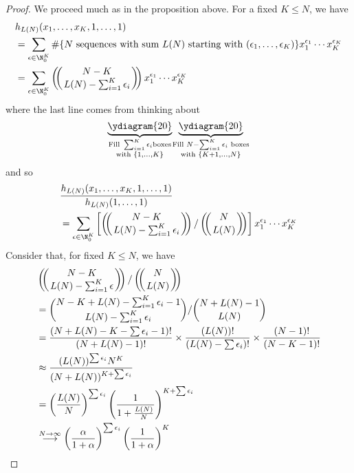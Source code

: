 \documentclass[11pt,leqno,oneside]{amsart}
\numberwithin{thm}{section}
\def\multiset#1#2{\ensuremath{\left(\kern-.3em\left(\genfrac{}{}{0pt}{}{#1}{#2}\right)\kern-.3em\right)}}
\begin{document}
\begin{proof}
  We proceed much as in the proposition above.
  For a fixed \(K \leq N\), we have
  \begin{align*}
    & h_{L(N)}(x_1, \ldots, x_K, 1, \ldots, 1) \\
    & = \sum_{\epsilon \in
      \N_0^K} \#\{N\text{ sequences with sum }L(N)\text{ starting with
      }(\epsilon_1, \ldots, \epsilon_K)\} x_1^{\epsilon_1}
      \cdots x_K^{\epsilon_K} \\
    & = \sum_{\epsilon \in \N_0^K}
      \multiset{N-K}{L(N)-\sum_{i=1}^K \epsilon_i}
      x_1^{\epsilon_1} \cdots x_K^{\epsilon_K}
  \end{align*}
  where the last line comes from thinking about \[
    \underbrace{\ydiagram{20}}_{\substack{\text{Fill }\sum_{i=1}^K \epsilon_i
      \text{boxes}\\ \text{with }\{1,\ldots,K\}}} \hspace{-0.05cm}
  \underbrace{\ydiagram{20}}_{\substack{\text{Fill }N-\sum_{i=1}^K
      \epsilon_i \text{ boxes}\\ \text{with }\{K+1, \ldots, N\}}}
  \]
  and so
  \begin{align*}
    & \frac{h_{L(N)}(x_1, \ldots, x_K, 1, \ldots,
    1)}{h_{L(N)}(1,\ldots,1)} \\
    & = \sum_{\epsilon \in
      \N_0^K} \left[\multiset{N-K}{L(N)-\sum_{i=1}^K \epsilon_i}/\multiset{N}{L(N)}\right] x_1^{\epsilon_1} \cdots x_K^{\epsilon_K}
  \end{align*}
  Consider that, for fixed \(K \leq N\), we have
  \begin{align*}
    & \multiset{N-K}{L(N)-\sum_{i=1}^K \epsilon} / 
    \multiset{N}{L(N)} \\
    & = \binom{N-K+L(N)-\sum_{i=1}^K \epsilon_i-1}{L(N)-\sum_{i=1}^K
    \epsilon_i} / \binom{N+L(N)-1}{L(N)}\\
    & = \frac{(N+L(N)-K-\sum \epsilon_i -1)!}{(N+L(N)-1)!} \times
    \frac{(L(N))!}{(L(N)-\sum \epsilon_i)!} \times
    \frac{(N-1)!}{(N-K-1)!} \\
    & \approx \frac{(L(N))^{\sum \epsilon_i} N^K}{(N+L(N))^{K+\sum
    \epsilon_i}} \\
    & = \left(\frac{L(N)}{N}\right)^{\sum \epsilon_i} \left(
    \frac{1}{1+\frac{L(N)}{N}} \right)^{K+\sum \epsilon_i} \\
    & \overset{N \to \infty}{\longrightarrow} \left( \frac{\alpha}{1+\alpha} \right)^{\sum \epsilon_i}\left(
    \frac{1}{1+\alpha} \right)^K 
  \end{align*}

\end{proof}
\end{document}
